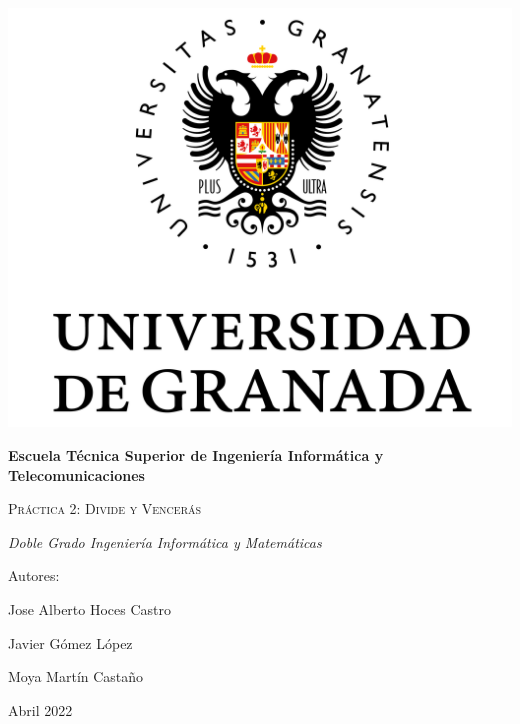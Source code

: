 \documentclass[10pt,a4paper]{article}
\begin{document}
	
\begin{titlepage}
	\centering
	{\includegraphics[scale=0.5]{Logo_UGR.png}\par}
	\vspace{1cm}
	{\bfseries\Large Escuela T\'ecnica Superior de Ingeniería Informática y Telecomunicaciones \par}
	\vspace{2.5cm}
	{\scshape\Huge Pr\'actica 2: Divide y Vencerás \par}
	\vspace{3cm}
	{\itshape\Large Doble Grado Ingeniería Informática y Matemáticas}
	\vfill
	{\Large Autores: \par}
	{\Large Jose Alberto Hoces Castro\par}
	{\Large Javier Gómez López \par}
	{\Large Moya Mart\'in Castaño \par}
	\vfill
	{\Large Abril 2022 \par}
\end{titlepage}

\thispagestyle{empty}
\null
\vfill
\end{document}
